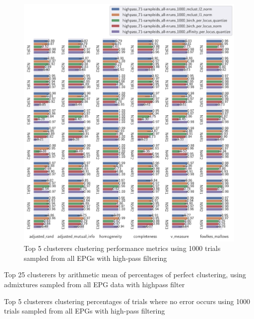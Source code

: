 \begin{theappendices}
\begin{figure}[htbp]
\centering
\includegraphics[width=\textwidth]{./figures/clust_comparison/highpass_71-sampleids_all-nruns_1000_top_5_clusterers_by_metrics.pdf}
\caption{Top 5 clusterers clustering performance metrics using 1000 trials sampled from all EPGs with high-pass filtering}
\label{appendix:fig:highpass_71-sampleids_all-nruns_1000_top_5_clusterers_by_metrics}
\end{figure}

\begin{table}[htbp]
\centering
{}
\caption{Top 25 clusterers by arithmetic mean of percentages of perfect clustering, using admixtures sampled from all EPG data with highpass filter}
\label{appendix:table:top_25_not_ensemble_clusterers_by_binomial_confidence_highpass_71-sampleids_all-nruns_1000}
\end{table}

\begin{table}[htbp]
\centering
{}
\caption{Top 5 clusterers clustering percentages of trials where no error occurs using 1000 trials sampled from all EPGs with high-pass filtering}
\label{appendix:table:highpass_71-sampleids_all-nruns_1000_top_5_clusterers_by_binomial_confidence}
\end{table}


\end{theappendices}
